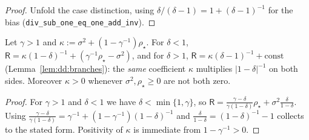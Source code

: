 \begin{proof}
  \leanok
Unfold the case distinction, using $\delta/(\delta-1)=1+(\delta-1)^{-1}$ for the bias
(\texttt{div\_sub\_one\_eq\_one\_add\_inv}).
\end{proof}

\begin{lemma}\label{lem:dd:keyIdentity}
  \leanok
Let $\gamma>1$ and $\kappa:=\sigma^2+(1-\gamma^{-1})\rho_\star$. For $\delta<1$,
$\mathsf R=\kappa(1-\delta)^{-1}+(\gamma^{-1}\rho_\star-\sigma^2)$, and for $\delta>1$,
$\mathsf R=\kappa(\delta-1)^{-1}+\text{const}$ (Lemma~\ref{lem:dd:branches}): the \emph{same} coefficient $\kappa$ multiplies
$|1-\delta|^{-1}$ on both sides. Moreover $\kappa>0$ whenever $\sigma^2,\rho_\star\ge0$ are not both zero.
\end{lemma}

\begin{proof}
  \leanok
For $\gamma>1$ and $\delta<1$ we have $\delta<\min\{1,\gamma\}$, so $\mathsf R=\frac{\gamma-\delta}{\gamma(1-\delta)}\rho_\star+\sigma^2\frac\delta{1-\delta}$.
Using $\frac{\gamma-\delta}{\gamma(1-\delta)}=\gamma^{-1}+(1-\gamma^{-1})(1-\delta)^{-1}$ and $\frac\delta{1-\delta}=(1-\delta)^{-1}-1$
collects to the stated form. Positivity of $\kappa$ is immediate from $1-\gamma^{-1}>0$.
\end{proof}

